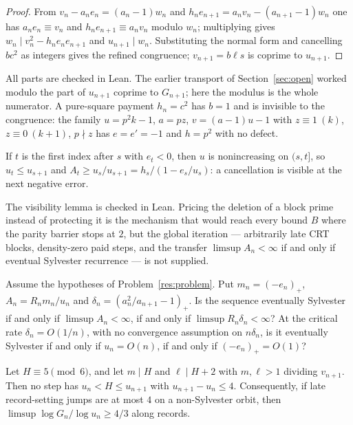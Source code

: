 \documentclass[11pt]{article}
\begin{document}
\begin{proof}
From $v_n-a_ne_n=(a_n-1)w_n$ and $h_ne_{n+1}=a_nv_n-(a_{n+1}-1)w_n$ one has
$a_ne_n\equiv v_n$ and $h_ne_{n+1}\equiv a_nv_n$ modulo $w_n$; multiplying
gives $w_n\mid v_n^2-h_ne_ne_{n+1}$ and $u_{n+1}\mid w_n$.  Substituting the
normal form and cancelling $bc^2$ as integers gives the refined congruence;
$v_{n+1}=b\ell s$ is coprime to $u_{n+1}$.
\end{proof}

All parts are checked in Lean.  The earlier transport of
Section~\ref{sec:open} worked modulo the part of $u_{n+1}$ coprime to
$G_{n+1}$; here the modulus is the whole numerator.  A pure-square payment
$h_n=c^2$ has $b=1$ and is invisible to the congruence: the family
$u=p^2k-1$, $a=pz$, $v=(a-1)u-1$ with $z\equiv1\ (k)$, $z\equiv0\ (k+1)$,
$p\nmid z$ has $e=e'=-1$ and $h=p^2$ with no defect.

\begin{lemma}\label{res:amplified}
If $t$ is the first index after $s$ with $e_t<0$, then $u$ is nonincreasing on
$(s,t]$, so $u_t\le u_{s+1}$ and
$A_t\ge u_s/u_{s+1}=h_s/(1-e_s/u_s)$: a cancellation is visible at the next
negative error.
\end{lemma}

The visibility lemma is checked in Lean.  Pricing the deletion of a block
prime instead of protecting it is the mechanism that would reach every bound
$B$ where the parity barrier stops at $2$, but the global iteration ---
arbitrarily late CRT blocks, density-zero paid steps, and the transfer
$\limsup A_n<\infty$ if and only if eventual Sylvester recurrence --- is not
supplied.

\begin{problem}\label{res:amplifiedglobal}
Assume the hypotheses of Problem~\ref{res:problem}.  Put $m_n=(-e_n)_+$,
$A_n=R_nm_n/u_n$ and $\delta_n=(a_n^2/a_{n+1}-1)_+$.  Is the sequence
eventually Sylvester if and only if $\limsup A_n<\infty$, if and only if
$\limsup R_n\delta_n<\infty$?  At the critical rate $\delta_n=O(1/n)$, with no
convergence assumption on $n\delta_n$, is it eventually Sylvester if and only
if $u_n=O(n)$, if and only if $(-e_n)_+=O(1)$?
\end{problem}

\begin{theorem}\label{res:twomodulus}
Let $H\equiv5\pmod6$, and let $m\mid H$ and $\ell\mid H+2$ with $m,\ell>1$
dividing $v_{n+1}$.  Then no step has $u_n<H\le u_{n+1}$ with
$u_{n+1}-u_n\le4$.  Consequently, if late record-setting jumps are at most $4$
on a non-Sylvester orbit, then $\limsup\log G_n/\log u_n\ge4/3$ along records.
\end{theorem}
\end{document}
